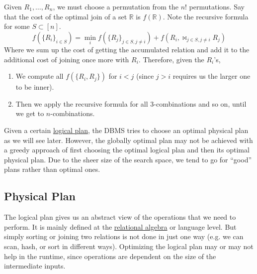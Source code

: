     \begin{algo}
      Given $R_1, \ldots, R_n$, we must choose a permutation from the $n!$ permutations. Say that the cost of the optimal join of a set $\mathbb{R}$ is $f(\mathbb{R})$. Note the recursive formula for some $S \subset [n]$. 
      \begin{equation}
        f(\{R_i\}_{i \in S}) = \min_i f(\{R_j\}_{j \in S, j \neq i}) + f(R_i, \bowtie_{j \in S, j \neq i} R_j) 
      \end{equation}
      Where we sum up the cost of getting the accumulated relation and add it to the additional cost of joining once more with $R_i$. Therefore, given the $R_i$'s, 
      \begin{enumerate}
        \item We compute all $f(\{R_i, R_j\})$ for $i < j$ (since $j > i$ requires us the larger one to be inner). 
        \item Then we apply the recursive formula for all 3-combinations and so on, until we get to $n$-combinations. 
      \end{enumerate}
    \end{algo}

    Given a certain \hyperref[def:logical-plan]{logical plan}, the DBMS tries to choose an optimal physical plan as we will see later. However, the globally optimal plan may not be achieved with a greedy approach of first choosing the optimal logical plan and then its optimal physical plan. Due to the sheer size of the search space, we tend to go for ``good'' plans rather than optimal ones. 

\subsection{Physical Plan}

    The logical plan gives us an abstract view of the operations that we need to perform. It is mainly defined at the \hyperref[def:relational-algebra]{relational algebra} or language level. But simply sorting or joining two relations is not done 
    in just one way (e.g. we can scan, hash, or sort in different ways). Optimizing the logical plan may or may not help in the runtime, since operations are dependent on the size of the intermediate inputs. 

